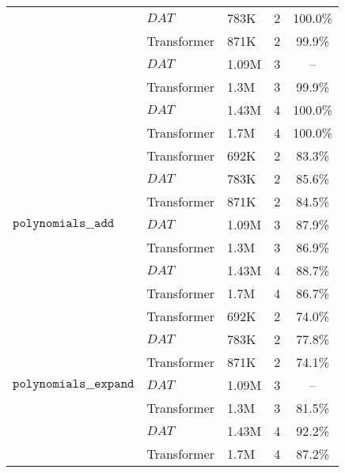 \begin{tabular}{l|l|l|c|c}
                                                              & $DAT$                & 783K   & 2         & 100.0\%  \\
                                                              & Transformer          & 871K   & 2         & 99.9\%   \\
                                                              & $DAT$                & 1.09M  & 3         & --       \\
                                                              & Transformer          & 1.3M   & 3         & 99.9\%   \\
                                                              & $DAT$                & 1.43M  & 4         & 100.0\%  \\
                                                              & Transformer          & 1.7M   & 4         & 100.0\%  \\
    \cline{1-5}
    \multirow{7}{*}{$\texttt{polynomials\_\_add}$}            & Transformer          & 692K   & 2         & 83.3\%   \\
                                                              & $DAT$                & 783K   & 2         & 85.6\%   \\
                                                              & Transformer          & 871K   & 2         & 84.5\%   \\
                                                              & $DAT$                & 1.09M  & 3         & 87.9\%   \\
                                                              & Transformer          & 1.3M   & 3         & 86.9\%   \\
                                                              & $DAT$                & 1.43M  & 4         & 88.7\%   \\
                                                              & Transformer          & 1.7M   & 4         & 86.7\%   \\
    \cline{1-5}
    \multirow{7}{*}{$\texttt{polynomials\_\_expand}$}         & Transformer          & 692K   & 2         & 74.0\%   \\
                                                              & $DAT$                & 783K   & 2         & 77.8\%   \\
                                                              & Transformer          & 871K   & 2         & 74.1\%   \\
                                                              & $DAT$                & 1.09M  & 3         & --       \\
                                                              & Transformer          & 1.3M   & 3         & 81.5\%      \\
                                                              & $DAT$                & 1.43M  & 4         & 92.2\%   \\
                                                              & Transformer          & 1.7M   & 4         & 87.2\%   \\
    \bottomrule
\end{tabular}
